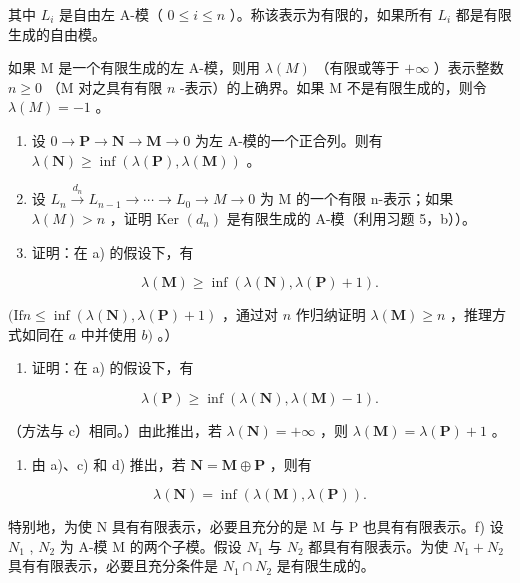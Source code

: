 其中 \(L_{i}\) 是自由左 A-模（ \(0 \leqslant i \leqslant n\) ）。称该表示为有限的，如果所有 \(L_{i}\) 都是有限生成的自由模。

如果 M 是一个有限生成的左 A-模，则用 \(\lambda(M)\) （有限或等于 \(+\infty\) ）表示整数 \(n \geqslant 0\) （M 对之具有有限 \(n\) -表示）的上确界。如果 M 不是有限生成的，则令 \(\lambda(M) = -1\) 。

\begin{enumerate}
\def\labelenumi{\alph{enumi})}
\item
  设 \(0 \to \mathbf{P} \to \mathbf{N} \to \mathbf{M} \to 0\) 为左 A-模的一个正合列。则有 \(\lambda(\mathbf{N}) \geqslant \inf (\lambda(\mathbf{P}), \lambda(\mathbf{M}))\) 。
\item
  设 \(L_{n} \xrightarrow{d_{n}} L_{n-1} \to \cdots \to L_{0} \to M \to 0\) 为 M 的一个有限 n-表示；如果 \(\lambda(M) > n\) ，证明 Ker \((d_{n})\) 是有限生成的 A-模（利用习题 5，b））。
\item
  证明：在 a) 的假设下，有
\end{enumerate}

\[
\lambda (\mathbf {M}) \geqslant \inf \left(\lambda (\mathbf {N}), \lambda (\mathbf {P}) + 1\right).
\]

\((\mathrm{If} n \leqslant \inf (\lambda(\mathbf{N}), \lambda(\mathbf{P}) + 1)\) ，通过对 \(n\) 作归纳证明 \(\lambda(\mathbf{M}) \geqslant n\) ，推理方式如同在 \(a\) 中并使用 \(b)\) 。）

\begin{enumerate}
\def\labelenumi{\alph{enumi})}
\setcounter{enumi}{3}
\tightlist
\item
  证明：在 a) 的假设下，有
\end{enumerate}

\[
\lambda (\mathbf {P}) \geqslant \inf \left(\lambda (\mathbf {N}), \lambda (\mathbf {M}) - 1\right).
\]

（方法与 c）相同。）由此推出，若 \(\lambda(\mathbf{N}) = +\infty\) ，则 \(\lambda(\mathbf{M}) = \lambda(\mathbf{P}) + 1\) 。

\begin{enumerate}
\def\labelenumi{\alph{enumi})}
\setcounter{enumi}{4}
\tightlist
\item
  由 a)、c) 和 d) 推出，若 \(\mathbf{N} = \mathbf{M} \oplus \mathbf{P}\) ，则有
\end{enumerate}

\[
\lambda (\mathbf {N}) = \inf \left(\lambda (\mathbf {M}), \lambda (\mathbf {P})\right).
\]

特别地，为使 N 具有有限表示，必要且充分的是 M 与 P 也具有有限表示。f) 设 \(N_{1}\) , \(N_{2}\) 为 A-模 M 的两个子模。假设 \(N_{1}\) 与 \(N_{2}\) 都具有有限表示。为使 \(N_{1} + N_{2}\) 具有有限表示，必要且充分条件是 \(N_{1} \cap N_{2}\) 是有限生成的。

